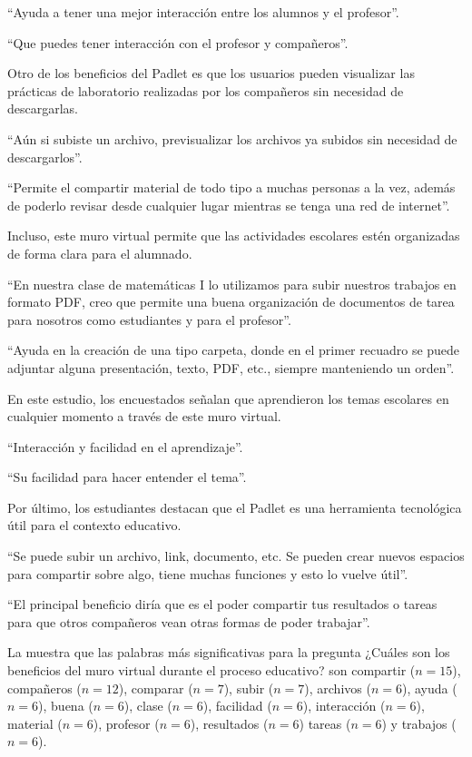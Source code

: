 \documentclass[spanish]{textolivre}
\begin{document}
“Ayuda a tener una mejor interacción entre los alumnos y el profesor”.

“Que puedes tener interacción con el profesor y compañeros”.

Otro de los beneficios del Padlet es que los usuarios pueden visualizar las prácticas de laboratorio realizadas por los compañeros sin necesidad de descargarlas.

“Aún si subiste un archivo, previsualizar los archivos ya subidos sin necesidad de descargarlos”.

“Permite el compartir material de todo tipo a muchas personas a la vez, además de poderlo revisar desde cualquier lugar mientras se tenga una red de internet”.

Incluso, este muro virtual permite que las actividades escolares estén organizadas de forma clara para el alumnado.

“En nuestra clase de matemáticas I lo utilizamos para subir nuestros trabajos en formato PDF, creo que permite una buena organización de documentos de tarea para nosotros como estudiantes y para el profesor”.

“Ayuda en la creación de una tipo carpeta, donde en el primer recuadro se puede adjuntar alguna presentación, texto, PDF, etc., siempre manteniendo un orden”.

En este estudio, los encuestados señalan que aprendieron los temas escolares en cualquier momento a través de este muro virtual.

“Interacción y facilidad en el aprendizaje”.

“Su facilidad para hacer entender el tema”.

Por último, los estudiantes destacan que el Padlet es una herramienta tecnológica útil para el contexto educativo.

“Se puede subir un archivo, link, documento, etc. Se pueden crear nuevos espacios para compartir sobre algo, tiene muchas funciones y esto lo vuelve útil”.

“El principal beneficio diría que es el poder compartir tus resultados o tareas para que otros compañeros vean otras formas de poder trabajar”.

La  muestra que las palabras más significativas para la pregunta ¿Cuáles son los beneficios del muro virtual durante el proceso educativo? son compartir ($n = 15$), compañeros ($n = 12$), comparar ($n = 7$), subir ($n = 7$), archivos ($n = 6$), ayuda ($n = 6$), buena ($n = 6$), clase ($n = 6$), facilidad ($n = 6$), interacción ($n = 6$), material ($n = 6$), profesor ($n = 6$), resultados ($n = 6$) tareas ($n = 6$) y trabajos ($n = 6$).
\end{document}
